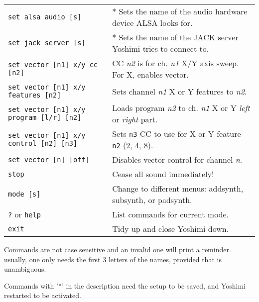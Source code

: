 \begin{table}[H]
\begin{tabular}{l l}
         \texttt{set alsa audio [s]} &
            * Sets the name of the audio hardware device ALSA looks for. \\

         \texttt{set jack server [s]} &
            * Sets the name of the JACK server Yoshimi tries to connect to. \\

         \texttt{set vector [n1] x/y cc [n2]} &
            CC \textsl{n2} is for ch. \textsl{n1} X/Y axis sweep.
            For X, enables vector. \\

         \texttt{set vector [n1] x/y features [n2]} &
            Sets channel \textsl{n1} X or Y features to \textsl{n2}. \\

         \texttt{set vector [n1] x/y program [l/r] [n2]} &
            Loads program \textsl{n2} to ch. \textsl{n1} X or Y
            \textsl{left} or \textsl{right} part. \\

         \texttt{set vector [n1] x/y control [n2] [n3]} &
            Sets \texttt{n3} CC to use for X or Y feature \texttt{n2}
            (2, 4, 8). \\

         \texttt{set vector [n] [off]} &
            Disables vector control for channel \textsl{n}. \\

         \texttt{stop} &
            Cease all sound immediately! \\

         \texttt{mode [s]} &
            Change to different menus: addsynth, subsynth, or padsynth. \\

         \texttt{?} or \texttt{help} &
            List commands for current mode. \\

         \texttt{exit} &
            Tidy up and close Yoshimi down. \\

      \end{tabular}
   \end{table}

   Commands are not case sensitive and an invalid one will print a reminder.
   usually, one only needs the first 3 letters of the names, provided that is
   unambiguous.

   Commands with '*' in the description need the setup to be saved, and Yoshimi
   restarted to be activated. 


